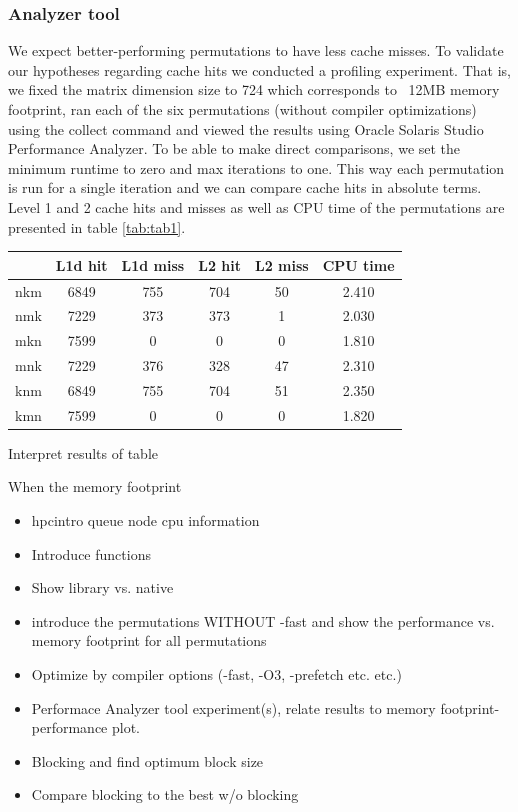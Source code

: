 \subsubsection{Analyzer tool}
We expect better-performing permutations to have less cache misses.   To validate our hypotheses regarding cache hits we conducted a profiling experiment. That is, we fixed the matrix dimension size to 724 which corresponds to ~12MB memory footprint, ran each of the six permutations (without compiler optimizations) using the collect command and viewed the results using Oracle Solaris Studio Performance Analyzer. To be able to make direct comparisons, we set the minimum runtime to zero and max iterations to one. This way each permutation is run for a single iteration and we can compare cache hits in absolute terms. \\
Level 1 and 2 cache hits and misses as well as CPU time of the permutations are presented in table \ref{tab:tab1}.
\begin{center}
 \label{tab:tab1} 
\begin{tabular}{ |c|c|c|c|c|c| } 
\hline
 & L1d hit & L1d miss & L2 hit & L2 miss & CPU time \\ 
\hline
nkm & 6849 & 755 & 704 & 50 & 2.410 \\  
\hline
nmk & 7229 & 373 & 373 & 1 & 2.030 \\ 
\hline
mkn & 7599 & 0 & 0 & 0 & 1.810 \\ 
\hline
mnk & 7229 & 376 & 328 & 47 & 2.310 \\ 
\hline
knm & 6849 & 755 & 704 & 51 & 2.350 \\ 
\hline
kmn & 7599 & 0 & 0 & 0 & 1.820 \\ 
\hline
\end{tabular}
\end{center}

Interpret results of table


When the memory footprint 



\begin{itemize}
\item hpcintro queue node cpu information
\item Introduce functions
\item Show library vs. native
\item introduce the permutations WITHOUT -fast and show the performance vs. memory footprint for all permutations
\item Optimize by compiler options (-fast, -O3, -prefetch etc. etc.)
\item Performace Analyzer tool experiment(s), relate results to  memory footprint-performance plot.
\item Blocking and find optimum block size
\item Compare blocking to the best w/o blocking
\end{itemize}
